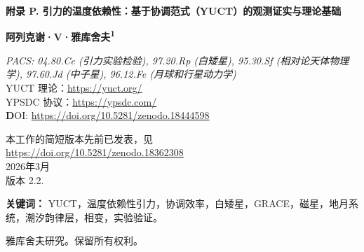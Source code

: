 \documentclass[12pt]{article}
\theoremstyle{remark}
\newcommand{\Keff}{K_{\mathrm{eff}}}
\newcommand{\eps}{\varepsilon}
\newcommand{\kappac}{\kappa_c}
\begin{document}
	
	\begin{titlepage}
		\centering
		\vspace*{0cm}
		
		\Huge\textbf{附录 P. 引力的温度依赖性：基于协调范式（YUCT）的观测证实与理论基础}
		
		\vspace{2.3cm}
		
		\Large\textbf{阿列克谢·V·雅库舍夫\textsuperscript{1}}
		
		\vspace{0.2cm}
		
		\vspace{1.3cm}
		\large\textit{PACS: 04.80.Cc (引力实验检验), 97.20.Rp (白矮星), 95.30.Sf (相对论天体物理学), 97.60.Jd (中子星), 96.12.Fe (月球和行星动力学)} \\
		
		YUCT 理论：\url{https://yuct.org/}\\
		YPSDC 协议：\url{https://ypsdc.com/}\\
		
		\vspace{2cm}
		\textbf DOI: \url{https://doi.org/10.5281/zenodo.18444598}\\
		
		\vspace{1cm}
		
		\large 
		本工作的简短版本先前已发表，见\\ \url{https://doi.org/10.5281/zenodo.18362308}\\
		\vspace{1cm}
		2026年3月 \\ \large 版本 2.2.
		
		\newpage
		\begin{abstract}
			\noindent
			本工作为有效引力常数对温度的依赖性假设提供了严格的数学基础，该假设源于雅库舍夫统一协调理论（YUCT）。利用分形误差标度普适律 $\eps = \kappac \alpha \Keff^{-\beta}$，其中经验确定的指数 $\beta = 0.67 \pm 0.03$，普适常数 $\kappac = 0.33$，我们表明加热物质时协调效率 $\Keff$ 的变化会导致引力场的改变。关键的观测证实来自对 SDSS DR1-19 数据中 26,041 颗白矮星引力红移的分析（Crumpler et al., 2024），结果显示在固定半径下热恒星的系统性能红移更大，显著性 $>6.1\sigma$。其他证实来自 GRACE 卫星数据（Rosat et al., 2025），该数据记录到地球地幔中钙钛矿–后钙钛矿相变引起的引力异常，以及对磁星（具有极强磁场的中子星，Kaspi \& Beloborodov, 2017）的分析。我们提出了一个具体的实验室实验来测量加热到居里点的铁磁体附近的引力变化；预期效应为 $\delta g/g \sim 10^{-16}$--$10^{-18}$，处于现代原子干涉仪的灵敏度极限。所得结果表明，引力常数并非基本常数，而是对物质热力学状态敏感的协调动力学的一种表现。
		\end{abstract}
		
		\vspace{0.3cm}
		\noindent
		\small\textbf{关键词：} YUCT，温度依赖性引力，协调效率，白矮星，GRACE，磁星，地月系统，潮汐韵律层，相变，实验验证。
		
		\vspace{0.1cm}
		\noindent
		 雅库舍夫研究。保留所有权利。
	\end{titlepage}
	
\end{document}
